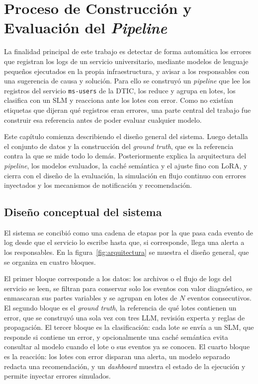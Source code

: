 \chapter{Proceso de Construcción y Evaluación del \textit{Pipeline}} \label{cap:metodologia}

La finalidad principal de este trabajo es detectar de forma automática los errores que registran los logs de un servicio universitario, mediante modelos de lenguaje pequeños ejecutados en la propia infraestructura, y avisar a los responsables con una sugerencia de causa y solución. Para ello se construyó un \textit{pipeline} que lee los registros del servicio \texttt{ms-users} de la DTIC, los reduce y agrupa en lotes, los clasifica con un SLM y reacciona ante los lotes con error. Como no existían etiquetas que dijeran qué registros eran errores, una parte central del trabajo fue construir esa referencia antes de poder evaluar cualquier modelo.

Este capítulo comienza describiendo el diseño general del sistema. Luego detalla el conjunto de datos y la construcción del \textit{ground truth}, que es la referencia contra la que se mide todo lo demás. Posteriormente explica la arquitectura del \textit{pipeline}, los modelos evaluados, la caché semántica y el ajuste fino con LoRA, y cierra con el diseño de la evaluación, la simulación en flujo continuo con errores inyectados y los mecanismos de notificación y recomendación.

\section{Diseño conceptual del sistema}\label{sec:met_vision}

El sistema se concibió como una cadena de etapas por la que pasa cada evento de log desde que el servicio lo escribe hasta que, si corresponde, llega una alerta a los responsables. En la figura~\ref{fig:arquitectura} se muestra el diseño general, que se organiza en cuatro bloques.

El primer bloque corresponde a los datos: los archivos o el flujo de logs del servicio se leen, se filtran para conservar solo los eventos con valor diagnóstico, se enmascaran sus partes variables y se agrupan en lotes de $N$ eventos consecutivos. El segundo bloque es el \textit{ground truth}, la referencia de qué lotes contienen un error, que se construyó una sola vez con tres LLM, revisión experta y reglas de propagación. El tercer bloque es la clasificación: cada lote se envía a un SLM, que responde si contiene un error, y opcionalmente una caché semántica evita consultar al modelo cuando el lote o sus eventos ya se conocen. El cuarto bloque es la reacción: los lotes con error disparan una alerta, un modelo separado redacta una recomendación, y un \textit{dashboard} muestra el estado de la ejecución y permite inyectar errores simulados.


